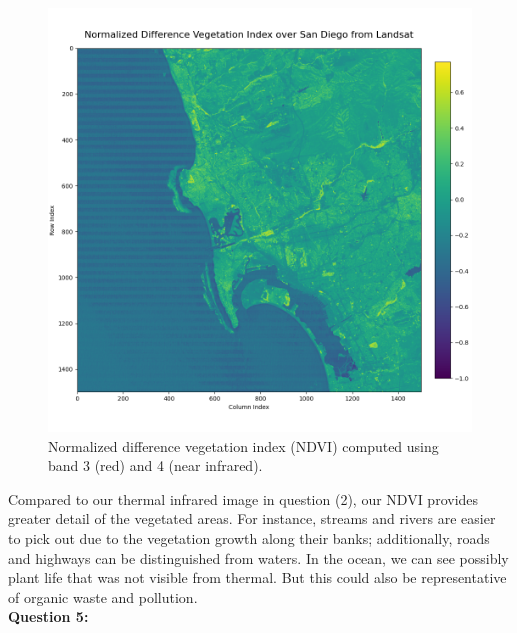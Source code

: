 \documentclass{homework}
\begin{document}
 \begin{figure}[H]
     \centering
     \includegraphics[width=\textwidth]{images/NDVI.png}
     \caption{Normalized difference vegetation index (NDVI) computed using band 3 (red) and 4 (near infrared). }
     \label{fig:NDVI}
 \end{figure}

Compared to our thermal infrared image in question (2), our NDVI provides greater detail of the vegetated areas. For instance, streams and rivers are easier to pick out due to the vegetation growth along their banks; additionally, roads and highways can be distinguished from waters. In the ocean, we can see possibly plant life that was not visible from thermal. But this could also be representative of organic waste and pollution. \\

\textbf{Question 5:} \\
\end{document}
